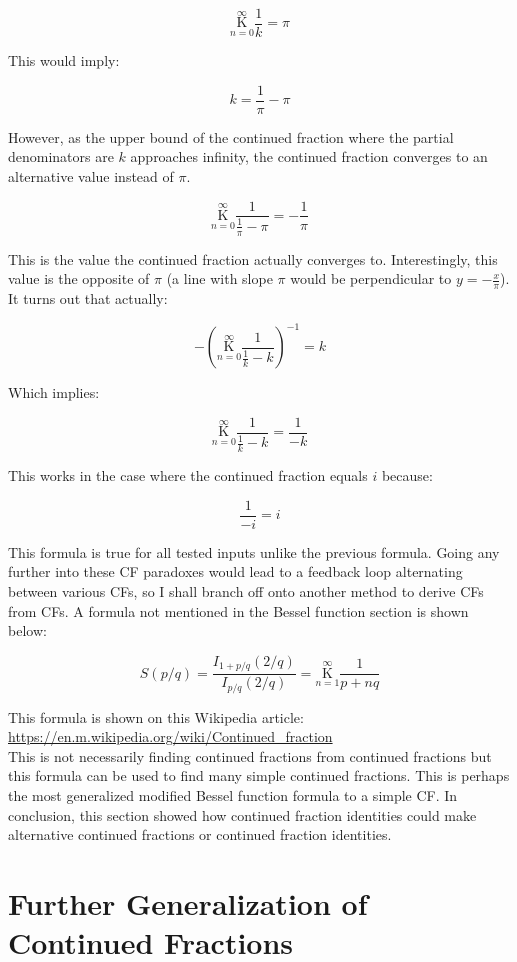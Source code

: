 \documentclass{article}
\begin{document}
$$\underset{n=0}{\overset{\infty}{\mathrm K}} \frac{1}{k}=\pi$$

This would imply:

$$k=\frac{1}{\pi}-\pi$$

However, as the upper bound of the continued fraction where the partial denominators are $k$ approaches infinity, the continued fraction converges to an alternative value instead of $\pi$.

$$\underset{n=0}{\overset{\infty}{\mathrm K}} \frac{1}{\frac{1}{\pi}-\pi}=-\frac{1}{\pi}$$

This is the value the continued fraction actually converges to. Interestingly, this value is the opposite of $\pi$ (a line with slope $\pi$ would be perpendicular to $y=-\frac{x}{\pi}$). It turns out that actually:

$$-(\underset{n=0}{\overset{\infty}{\mathrm K}} \frac{1}{\frac{1}{k}-k})^{-1}=k$$

Which implies:

$$\underset{n=0}{\overset{\infty}{\mathrm K}} \frac{1}{\frac{1}{k}-k}=\frac{1}{-k}$$

This works in the case where the continued fraction equals $i$ because:

$$\frac{1}{-i}=i$$

This formula is true for all tested inputs unlike the previous formula. Going any further into these CF paradoxes would lead to a feedback loop alternating between various CFs, so I shall branch off onto another method to derive CFs from CFs. A formula not mentioned in the Bessel function section is shown below:

$$S(p/q)=\frac{I_{1+p/q}(2/q)}{I_{p/q}(2/q)}=\underset{n=1}{\overset{\infty}{\mathrm K}} \frac{1}{p+nq}$$

This formula is shown on this Wikipedia article: \url{https://en.m.wikipedia.org/wiki/Continued_fraction}
$${}$$
This is not necessarily finding continued fractions from continued fractions but this formula can be used to find many simple continued fractions. This is perhaps the most generalized modified Bessel function formula to a simple CF. In conclusion, this section showed how continued fraction identities could make alternative continued fractions or continued fraction identities.

\section{Further Generalization of Continued Fractions}
\end{document}
